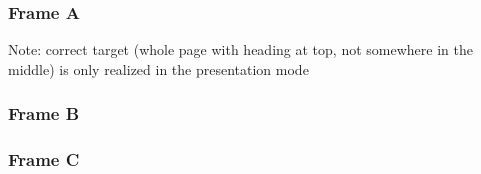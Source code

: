 \documentclass{beamer}
\begin{document}
 

\begin{frame}[label=frameA]
\frametitle{\hyperlink{frameB}{}Frame A}
Note: correct target (whole page with heading at top, not somewhere in
the middle) is only realized in the presentation mode

\hyperlink{frameB}{}
\hyperlink{frameC}{}
\end{frame}

\begin{frame}[label=frameB]
\frametitle{\hyperlink{frameC}{}Frame B}
\label{frameBalt}
\hyperlink{frameA}{}
\hyperlink{framec}{}
\end{frame}

\begin{frame}[label=frameC]
\frametitle{Frame C}
\hyperlink{frameA}{}
\hyperlink{frameB}{}
\hyperlink{frameBalt}{}
\end{frame}
\end{document}
